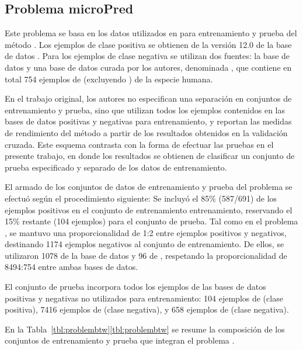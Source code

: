 %
%
\subsection{Problema microPred}
%
Este problema se basa en los datos utilizados en \cite{batuwita} para
entrenamiento y prueba del método \work{\micropred}.
Los ejemplos de clase positiva se obtienen de la versión 12.0 de la
base de datos \work{\mirbase}.
Para los ejemplos de clase negativa se utilizan dos fuentes: la base
de datos  y una base de datos curada por los autores,
denominada , que contiene en total 754
ejemplos de  (excluyendo ) de la especie humana.

En el trabajo original, los autores no especifican una separación
en conjuntos de entrenamiento y prueba, sino que utilizan todos los
ejemplos contenidos en las bases de datos positivas y negativas para
entrenamiento, y reportan las medidas de rendimiento del método
a partir de los resultados obtenidos en la validación cruzada.
Este esquema contrasta con la forma de efectuar las pruebas en el
presente trabajo, en donde los resultados se obtienen de clasificar un
conjunto de prueba especificado y separado de los datos de
entrenamiento.

El armado de los conjuntos de datos de entrenamiento y prueba del
problema \prob\micropred{} se efectuó según el procedimiento
siguiente: Se incluyó el 85\% (587/691) de los ejemplos positivos en
el conjunto de entrenamiento entrenamiento, reservando el 15\%
restante (104 ejemplos) para el conjunto de prueba.
Tal como en el problema \prob{\mipred}, se mantuvo una
proporcionalidad de 1:2 entre ejemplos positivos y negativos,
destinando 1174 ejemplos negativos al conjunto de entrenamiento.
De ellos, se utilizaron 1078 de la base de datos  y 96
de , respetando la proporcionalidad de
8494:754 entre ambas bases de datos.

El conjunto de prueba incorpora todos los ejemplos de las bases de
datos positivas y negativas no utilizados para entrenamiento: 104
ejemplos de  (clase positiva), 7416 ejemplos de
 (clase negativa), y 658 ejemplos de  (clase negativa).

En la \iflatexml{}Tabla~\ref{tbl:problembtw}\else\autoref{tbl:problembtw}\fi{}
se resume la composición de los conjuntos de entrenamiento y prueba
que integran el problema \prob\micropred.
